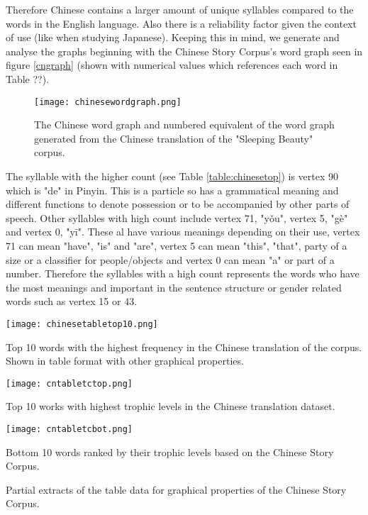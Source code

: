 Therefore Chinese contains a larger amount of unique syllables compared to the words in the English language. Also there is a reliability factor given the context of use (like when studying Japanese). Keeping this in mind, we generate and analyse the graphs beginning with the Chinese Story Corpus's word graph seen in figure \ref{cngraph} (shown with numerical values which references each word in Table ??).

\begin{figure}[H]
\centering
\texttt{[image: chinesewordgraph.png]}
\caption{The Chinese word graph and numbered equivalent of the word graph generated from the Chinese translation of the "Sleeping Beauty" corpus.}
\label{fig:cngraph}
\end{figure}

The syllable with the higher count (see Table \ref{table:chinesetop}) is vertex 90 which is "de" in Pinyin. This is a particle so has a grammatical meaning and different functions to denote possession or to be accompanied by other parts of speech. Other syllables with high count include vertex 71, "yǒu", vertex 5, "gè" and vertex 0, "yī". These al have various meanings depending on their use, vertex 71 can mean "have", "is" and "are", vertex 5 can mean "this", "that", party of a size or a classifier for people/objects and vertex 0 can mean "a" or part of a number. Therefore the syllables with a high count represents the words who have the most meanings and important in the sentence structure or gender related words such as vertex 15 or 43.

\begin{table}[H]
\centering
\texttt{[image: chinesetabletop10.png]}
\caption{Top 10 words with the highest frequency in the Chinese translation of the corpus. Shown in table format with other graphical properties. }
\label{table:chinesetop}
\end{table}

\begin{table}[H]
\centering
\begin{subtable}{.45\textwidth}
	\centering
	\texttt{[image: cntabletctop.png]}
	\caption{Top 10 works with highest trophic levels in the Chinese translation dataset.}
	\label{table:chinesetoptc}
\end{subtable}
\hfill
\begin{subtable}{.45\textwidth}
	\centering
	\texttt{[image: cntabletcbot.png]}
	\caption{Bottom 10 words ranked by their trophic levels based on the Chinese Story Corpus.}
	\label{table:chinesebottc}
\end{subtable}
\caption{Partial extracts of the table data for graphical properties of the Chinese Story Corpus.}
\end{table}

